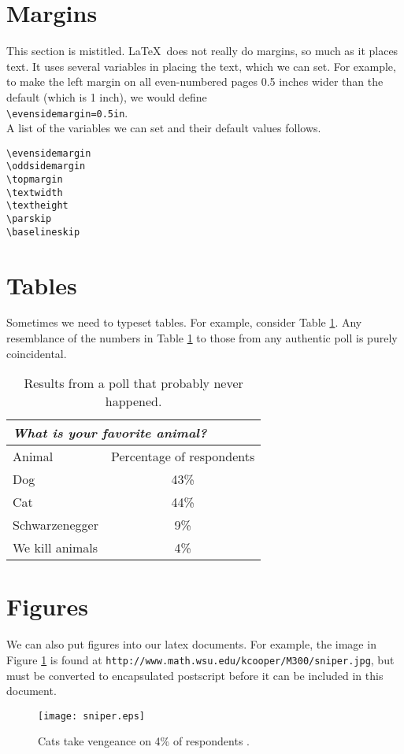 \documentclass[12pt]{article}
\begin{document}
\section{Margins}
This section is mistitled.
\LaTeX\ does not really do margins,
so much as it places text.
It uses several variables in placing the
text, which we can set.
For example, to make the left margin on
all even-numbered pages 0.5 inches wider than the default (which is 
1 inch), we would define\\
\verb(\evensidemargin=0.5in(.\\
A list of the variables we can set and their default values follows.
\begin{verbatim}
\evensidemargin
\oddsidemargin
\topmargin
\textwidth
\textheight
\parskip
\baselineskip
\end{verbatim}

\section{Tables}
Sometimes we need to typeset tables.
For example, 
consider Table \ref{animaltable}.  
Any resemblance of the numbers in 
Table \ref{animaltable} to those from any authentic poll is purely coincidental.
\begin{table}
    \begin{center}
        \caption{\label{animaltable}
        Results from a poll that probably never happened.}
        \begin{tabular}{||l|c||}
            \hline
            \cline{1-2}
            \multicolumn{2}{||l||}{{\it What is your favorite animal?}}\\
            \hline
            Animal & Percentage of respondents\\
            \hline
            Dog & 43\%\\
            Cat & 44\%\\
            Schwarzenegger & 9\%\\
            We kill animals & 4\%\\
            \hline
            \hline
        \end{tabular}
    \end{center}
\end{table}

\section{Figures}
We can also put figures into our latex documents.
For example, the
image in Figure \ref{sniper} is found at 
{\tt http://www.math.wsu.edu/kcooper/M300/sniper.jpg}, but must
be converted to encapsulated postscript before it can be included
in this document.
\begin{figure}[ht]
    \begin{center}
        \texttt{[image: sniper.eps]}
        \caption{\label{sniper}
        Cats take vengeance on 4\% of respondents \cite{calvin}.}
        \vfill
    \end{center}
\end{figure}
\end{document}
